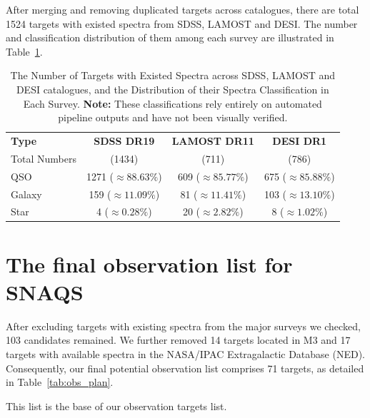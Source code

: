 After merging and removing duplicated targets across catalogues, there are total \num{1524} targets with existed spectra from SDSS, LAMOST and DESI. The number and classification distribution of them among each survey are illustrated in Table~\ref{tab:survey_in_selec}.
\begin{table}[htbp]
    \centering
    \begin{tabular}{l c c c}
        \toprule
        \textbf{Type} & \textbf{SDSS DR19} & \textbf{LAMOST DR11} & \textbf{DESI DR1} \\
        Total Numbers & (\num{1434}) & (\num{711}) & (\num{786}) \\
        \midrule
        QSO    & \num{1271} ($\approx 88.63\%$) & \num{609} ($\approx 85.77\%$) & \num{675} ($\approx 85.88\%$) \\
        Galaxy & \num{159} ($\approx 11.09\%$)  & \num{81} ($\approx 11.41\%$)  & \num{103} ($\approx 13.10\%$) \\
        Star   & \num{4} ($\approx 0.28\%$)     & \num{20} ($\approx 2.82\%$)   & \num{8} ($\approx 1.02\%$)    \\
        \bottomrule
    \end{tabular}
    \caption{The Number of Targets with Existed Spectra across SDSS, LAMOST and DESI catalogues, and the Distribution of their Spectra Classification in Each Survey. \textbf{Note:} These classifications rely entirely on automated pipeline outputs and have not been visually verified.}
    \label{tab:survey_in_selec}
\end{table}

\section{The final observation list for SNAQS}

After excluding targets with existing spectra from the major surveys we checked, 103 candidates remained. We further removed 14 targets located in M3 and 17 targets with available spectra in the NASA/IPAC Extragalactic Database (NED). Consequently, our final potential observation list comprises 71 targets, as detailed in Table~\ref{tab:obs_plan}.



This list is the base of our observation targets list.